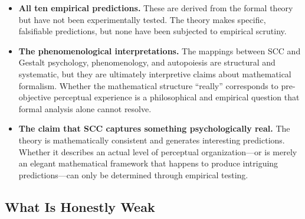 \documentclass[lettersize,journal]{IEEEtran}
\begin{document}
\begin{itemize}
\item \textbf{All ten empirical predictions.} These are derived from the formal theory but have not been experimentally tested. The theory makes specific, falsifiable predictions, but none have been subjected to empirical scrutiny.

\item \textbf{The phenomenological interpretations.} The mappings between SCC and Gestalt psychology, phenomenology, and autopoiesis are structural and systematic, but they are ultimately interpretive claims about mathematical formalism. Whether the mathematical structure ``really'' corresponds to pre-objective perceptual experience is a philosophical and empirical question that formal analysis alone cannot resolve.

\item \textbf{The claim that SCC captures something psychologically real.} The theory is mathematically consistent and generates interesting predictions. Whether it describes an actual level of perceptual organization---or is merely an elegant mathematical framework that happens to produce intriguing predictions---can only be determined through empirical testing.
\end{itemize}

\subsection{What Is Honestly Weak}
\end{document}
